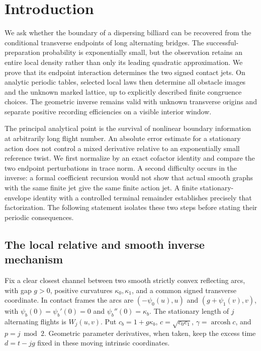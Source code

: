 \section{Introduction}
\label{sec:v56-introduction}

We ask whether the boundary of a dispersing billiard can be recovered
from the conditional transverse endpoints of long alternating bridges.
The successful-preparation probability is exponentially small, but the
observation retains an entire local density rather than only its leading
quadratic approximation.  We prove that its endpoint interaction determines
the two signed contact jets.  On analytic periodic tables, selected local
laws then determine all obstacle images and the unknown marked lattice,
up to explicitly described finite congruence choices.  The geometric
inverse remains valid with unknown transverse origins and separate positive
recording efficiencies on a visible interior window.

The principal analytical point is the survival of nonlinear boundary
information at arbitrarily long flight number.  An absolute error estimate
for a stationary action does not control a mixed derivative relative to an
exponentially small reference twist.  We first normalize by an exact
cofactor identity and compare the two endpoint perturbations in trace norm.
A second difficulty occurs in the inverse: a formal coefficient recursion
would not show that actual smooth graphs with the same finite jet give the
same finite action jet.  A finite stationary-envelope identity with a
controlled terminal remainder establishes precisely that factorization.
The following statement isolates these two steps before stating their
periodic consequences.

\subsection{The local relative and smooth inverse mechanism}

Fix a clear closest channel between two smooth strictly convex reflecting
arcs, with gap $g>0$, positive curvatures $\kappa_0,\kappa_1$, and a
common signed transverse coordinate.  In contact frames the arcs are
$(-\psi_0(u),u)$ and $(g+\psi_1(v),v)$, with
$\psi_b(0)=\psi_b'(0)=0$ and $\psi_b''(0)=\kappa_b$.
The stationary length of $j$ alternating flights is $W_j(u,v)$.
Put $c_b=1+g\kappa_b$, $c=\sqrt{c_0c_1}$,
$\gamma=\operatorname{arcosh}c$, and $p=j\bmod2$.  Geometric
parameter derivatives, when taken, keep the excess time
$d=t-jg$ fixed in these moving intrinsic coordinates.

